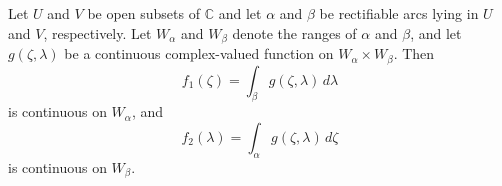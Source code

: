 Let $U$ and $V$ be open subsets of $\mathbb{C}$ and let $\alpha$ and $\beta$ be rectifiable arcs lying in $U$ and $V$, respectively. Let $W_{\alpha}$ and $W_{\beta}$ denote the ranges of $\alpha$ and $\beta$, and let $g(\zeta, \lambda)$ be a continuous complex-valued function on $W_{\alpha} \times W_{\beta}$. Then
$$f_1(\zeta) = \int_{\beta} g(\zeta, \lambda) \, d\lambda$$
is continuous on $W_{\alpha}$, and
$$f_2(\lambda) = \int_{\alpha} g(\zeta, \lambda) \, d\zeta$$
is continuous on $W_{\beta}$.
